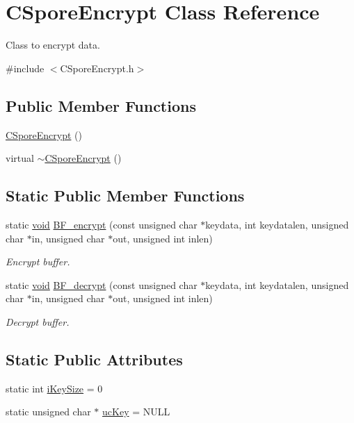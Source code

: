 \hypertarget{class_c_spore_encrypt}{\section{\-C\-Spore\-Encrypt \-Class \-Reference}
\label{class_c_spore_encrypt}
}


\-Class to encrypt data.  




{\ttfamily \#include $<$\-C\-Spore\-Encrypt.\-h$>$}

\subsection*{\-Public \-Member \-Functions}
\begin{DoxyCompactItemize}
\item 
\hyperlink{class_c_spore_encrypt_a6e14ddd8318a19377f0495c1dde02d12}{\-C\-Spore\-Encrypt} ()
\item 
virtual \hyperlink{class_c_spore_encrypt_a329bba299e2830874dff58a6a8fd06e0}{$\sim$\-C\-Spore\-Encrypt} ()
\end{DoxyCompactItemize}
\subsection*{\-Static \-Public \-Member \-Functions}
\begin{DoxyCompactItemize}
\item 
static \hyperlink{_cpclient_8h_a6464f7480a0fd0ee170cba12b2c0497f}{void} \hyperlink{class_c_spore_encrypt_a86040e68be4b03236eb4effbbd267239}{\-B\-F\-\_\-encrypt} (const unsigned char $\ast$keydata, int keydatalen, unsigned char $\ast$in, unsigned char $\ast$out, unsigned int inlen)
\begin{DoxyCompactList}\small\item\em \-Encrypt buffer. \end{DoxyCompactList}\item 
static \hyperlink{_cpclient_8h_a6464f7480a0fd0ee170cba12b2c0497f}{void} \hyperlink{class_c_spore_encrypt_a7dbc2b457ebf62ed52d4f004254914e9}{\-B\-F\-\_\-decrypt} (const unsigned char $\ast$keydata, int keydatalen, unsigned char $\ast$in, unsigned char $\ast$out, unsigned int inlen)
\begin{DoxyCompactList}\small\item\em \-Decrypt buffer. \end{DoxyCompactList}\end{DoxyCompactItemize}
\subsection*{\-Static \-Public \-Attributes}
\begin{DoxyCompactItemize}
\item 
static int \hyperlink{class_c_spore_encrypt_a6a83763486e61a888a59470f4d49a92f}{i\-Key\-Size} = 0
\item 
static unsigned char $\ast$ \hyperlink{class_c_spore_encrypt_ace12b5cef18687d97bab31ea9ebfb787}{uc\-Key} = \-N\-U\-L\-L
\end{DoxyCompactItemize}
